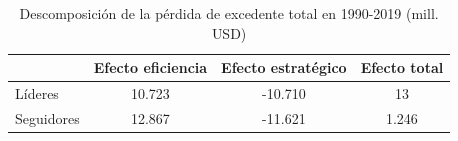 
\begin{table}[H]
\centering
\caption{Descomposición de la pérdida de excedente total en 1990-2019 (mill. USD)}
\label{tab:descomp_g}
\begin{tabular}{lccc}
\hline
            & \textbf{Efecto eficiencia} & \textbf{Efecto estratégico} & \textbf{Efecto total} \\ \hline
Líderes     & 10.723             & -10.710             & 13          \\
Seguidores  & 12.867             & -11.621             & 1.246        \\ \hline
\end{tabular}%

\end{table}